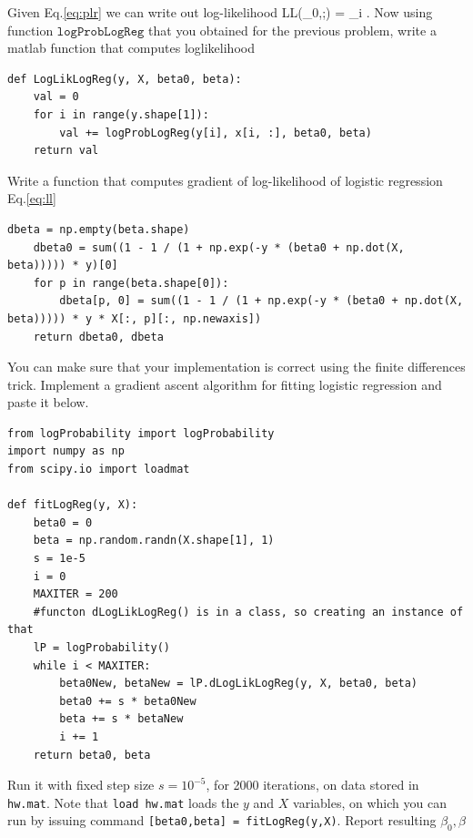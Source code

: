\documentclass{article}
\begin{document}
\newproblem{1pt}
Given Eq.\eqref{eq:plr} we can write out log-likelihood
\BEQ \label{eq:ll}
\textrm{LL}(\beta_0,\beta;) = \sum_i \log {}.
\EEQ
Now using function $\texttt{logProbLogReg}$ that you obtained for the previous problem, write a matlab function that computes loglikelihood
\begin{lstlisting}
def LogLikLogReg(y, X, beta0, beta):
	val = 0
	for i in range(y.shape[1]):
		val += logProbLogReg(y[i], x[i, :], beta0, beta)
	return val
\end{lstlisting}
\newproblem{1pt}
Write a function that computes gradient of log-likelihood of logistic regression Eq.\eqref{eq:ll}
\begin{lstlisting}
dbeta = np.empty(beta.shape)
	dbeta0 = sum((1 - 1 / (1 + np.exp(-y * (beta0 + np.dot(X, beta))))) * y)[0]
	for p in range(beta.shape[0]):
		dbeta[p, 0] = sum((1 - 1 / (1 + np.exp(-y * (beta0 + np.dot(X, beta))))) * y * X[:, p][:, np.newaxis])
	return dbeta0, dbeta
\end{lstlisting}
You can make sure that your implementation is correct using the finite differences trick.
\newproblem{1pt}
Implement a gradient ascent algorithm for fitting logistic regression and paste it below.
\begin{lstlisting}
from logProbability import logProbability
import numpy as np
from scipy.io import loadmat

def fitLogReg(y, X):
	beta0 = 0
	beta = np.random.randn(X.shape[1], 1)
	s = 1e-5
	i = 0
	MAXITER = 200
	#functon dLogLikLogReg() is in a class, so creating an instance of that
	lP = logProbability()
	while i < MAXITER:
		beta0New, betaNew = lP.dLogLikLogReg(y, X, beta0, beta)
		beta0 += s * beta0New
		beta += s * betaNew
		i += 1
	return beta0, beta
\end{lstlisting}
Run it with fixed step size $s=10^{-5}$, for 2000 iterations, on data stored in \texttt{hw\theHW.mat}.
Note that \texttt{load hw\theHW.mat} loads the $y$ and $X$ variables, on which you can run by issuing command
\texttt{[beta0,beta] = fitLogReg(y,X)}.
Report resulting $\beta_0,\beta$
\end{document}
